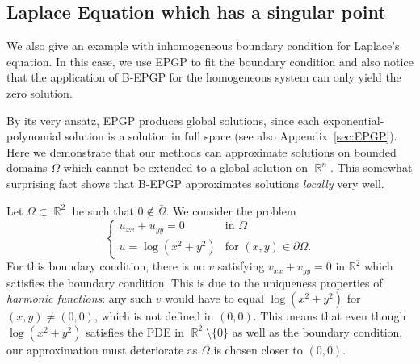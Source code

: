 \documentclass{article} %
\theoremstyle{plain}
\theoremstyle{definition}
\theoremstyle{remark}
\DeclareMathOperator*{\R}{\mathbb{R}}
\newcommand{\p}{\partial}
\newcommand{\RR}{\mathbb{R}}
\begin{document}
\subsection{Laplace Equation which has a singular point}\label{sec:singularity}

We also give an example with inhomogeneous boundary condition for Laplace's equation. In this case, we use EPGP to fit the boundary condition and also notice that the application of B-EPGP for the homogeneous system can only yield the zero solution.

By its very ansatz, EPGP produces global solutions, since each exponential-polynomial solution is a solution in full space (see also Appendix~\ref{sec:EPGP}). Here we demonstrate that our methods can approximate solutions on bounded domains $\Omega$ which cannot be extended to a global solution on $\R^n$. This somewhat surprising fact shows that B-EPGP approximates solutions \emph{locally} very well.

Let $\Omega\subset \R^2$ be such that $0\notin\bar\Omega$. We consider the problem
\[
\begin{cases}
     u_{xx}+u_{yy} = 0 &\text{in \(\Omega\)}\\
    u = \log{(x^2+y^2)} &\text{for \((x,y)\in\p\Omega\)}.
\end{cases}
\]
For this boundary condition, there is no $v$ satisfying $v_{xx}+v_{yy}=0$ in $\RR^2$ which satisfies the boundary condition. This is due to the uniqueness properties of \emph{harmonic functions}: any such $v$ would have to equal $\log(x^2+y^2)$ for $(x,y)\neq(0,0)$, which is not defined in $(0,0)$.
This means that even though $\log(x^2+y^2)$ satisfies the PDE in $\R^2\setminus\{0\}$ as well as the boundary condition, our approximation must deteriorate as $\Omega$ is chosen closer to $(0,0)$.
\end{document}
